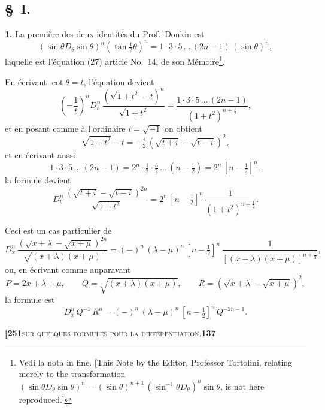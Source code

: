\documentclass[11pt]{article}
\begin{document}
\subsection*{§~I.}

\textbf{1.} La première des deux identités du Prof.~Donkin est
\[
(\sin\theta D_{\theta} \sin\theta)^n (\tan \tfrac{1}{2}\theta)^n = 1\cdot 3\cdot 5\,\ldots\,(2n-1)\,(\sin\theta)^n,
\]
laquelle est l'équation (27) article No.~14, de son Mémoire\footnote{Vedi la nota in fine. [This Note by the Editor, Professor Tortolini, relating merely to the transformation $(\sin\theta D_{\theta} \sin\theta)^n = (\sin\theta)^{n+1}\,(\sin^{-1}\theta D_{\theta})^n \sin\theta$, is not here reproduced.]}.

En écrivant $\cot\theta = t$, l'équation devient
\[
\left(-\dfrac{1}{t}\right)^n D_t^n\,\frac{(\sqrt{1+t^2} - t)^n}{\sqrt{1+t^2}} = \frac{1\cdot 3\cdot 5\,\ldots\,(2n-1)}{(1+t^2)^{n+\frac{1}{2}}},
\]
et en posant comme à l'ordinaire $i = \sqrt{-1}$ on obtient
\[
\sqrt{1+t^2} - t = -\tfrac{i}{2}\,(\sqrt{t+i} - \sqrt{t-i})^2,
\]
et en écrivant aussi
\[
1\cdot 3\cdot 5\,\ldots\,(2n-1) = 2^n\cdot\tfrac{1}{2}\cdot\tfrac{3}{2}\,\ldots\,(n-\tfrac{1}{2}) = 2^n\,[n-\tfrac{1}{2}]^n,
\]
la formule devient
\[
D_t^n\,\frac{(\sqrt{t+i} - \sqrt{t-i})^{2n}}{\sqrt{1+t^2}} = 2^n\,[n-\tfrac{1}{2}]^n\,\frac{1}{(1+t^2)^{n+\frac{1}{2}}}.
\]

Ceci est un cas particulier de
\[
D_x^n\,\frac{(\sqrt{x+\lambda} - \sqrt{x+\mu})^{2n}}{\sqrt{(x+\lambda)(x+\mu)}} = (-)^n\,(\lambda - \mu)^n\,[n-\tfrac{1}{2}]^n\,\frac{1}{[(x+\lambda)(x+\mu)]^{n+\frac{1}{2}}},
\]
ou, en écrivant comme auparavant
\[
P = 2x + \lambda + \mu,\qquad Q = \sqrt{(x+\lambda)(x+\mu)},\qquad R = (\sqrt{x+\lambda} - \sqrt{x+\mu})^2,
\]
la formule est
\[
D_x^n\,Q^{-1}\,R^n = (-)^n\,(\lambda - \mu)^n\,[n-\tfrac{1}{2}]^n\,Q^{-2n-1}.
\]

\newpage

\noindent\textbf{[251}\hfill\textsc{sur quelques formules pour la différentiation.}\hfill\textbf{137}

\medskip
\end{document}
